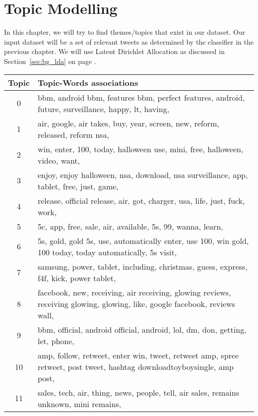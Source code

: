 \chapter{Topic Modelling}
\label{cha:topic_modelling}
In this chapter, we will try to find themes/topics that exist in our dataset. Our input dataset will
be a set of relevant tweets as determined by the classifier in the previous chapter. We will use
Latent Dirichlet Allocation as discussed in Section~\ref{sec:bg_lda} on page \pageref{sec:bg_lda}.

\begin{table}
  \begin{tabular}{c p{16cm}} \toprule
    Topic & Topic-Words associations \\ \midrule
    0     & bbm, android bbm, features bbm, perfect features, android, future, surveillance, happy,
    lt, having, \\ \midrule
    1     & air, google, air takes, buy, year, screen, new, reform, released, reform nsa, \\
    \midrule
    2     & win, enter, 100, today, halloween use, mini, free, halloween, video, want, \\ \midrule
    3     & enjoy, enjoy halloween, nsa, download, nsa surveillance, app, tablet, free, just, game,
    \\ \midrule
    4     & release, official release, air, got, charger, usa, life, just, fuck, work, \\ \midrule
    5     & 5c, app, free, sale, air, available, 5s, 99, wanna, learn, \\ \midrule
    6     & 5s, gold, gold 5s, use, automatically enter, use 100, win gold, 100 today, today
    automatically, 5s visit, \\ \midrule
    7     & samsung, power, tablet, including, christmas, guess, express, f4f, kick, power tablet,
    \\ \midrule
    8     & facebook, new, receiving, air receiving, glowing reviews, receiving glowing, glowing,
    like, google facebook, reviews wall, \\ \midrule
    9     & bbm, official, android official, android, lol, dm, don, getting, let, phone, \\ \midrule
    10    & amp, follow, retweet, enter win, tweet, retweet amp, spree retweet, post tweet, hashtag
    downloadtoyboysingle, amp post, \\ \midrule
    11    & sales, tech, air, thing, news, people, tell, air sales, remains unknown, mini remains,
    \\ \midrule

\end{tabular}
\end{table}

